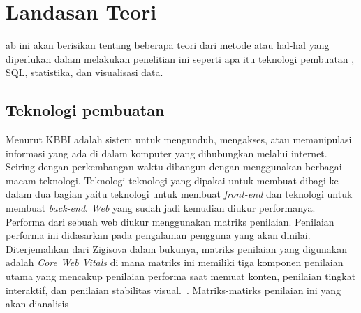 \chapter{Landasan Teori}
\label{chap:teori}

ab ini akan berisikan tentang beberapa teori dari metode atau hal-hal yang diperlukan dalam melakukan penelitian ini seperti apa itu teknologi pembuatan \web, SQL, statistika, dan visualisasi data.

\section{Teknologi pembuatan \web}
\label{sec:web} 
 
Menurut KBBI \web adalah sistem untuk mengunduh, mengakses, atau memanipulasi informasi yang ada di dalam komputer yang dihubungkan melalui internet. Seiring dengan perkembangan waktu \web dibangun dengan menggunakan berbagai macam teknologi.
Teknologi-teknologi yang dipakai untuk membuat \web dibagi ke dalam dua bagian yaitu teknologi untuk membuat \textit{front-end} dan teknologi untuk membuat \textit{back-end}. \textit{Web} yang sudah jadi kemudian diukur performanya. Performa dari sebuah web diukur menggunakan matriks penilaian. Penilaian performa ini didasarkan pada pengalaman pengguna \web yang akan dinilai. Diterjemahkan dari Zigisova dalam bukunya, matriks penilaian yang digunakan adalah \textit{Core Web Vitals} di mana matriks ini memiliki tiga komponen penilaian utama yang mencakup penilaian performa saat memuat konten, penilaian tingkat interaktif, dan penilaian stabilitas visual.~\cite{WebAlmanac.2024.Performance}. Matriks-matirks penilaian ini yang akan dianalisis


